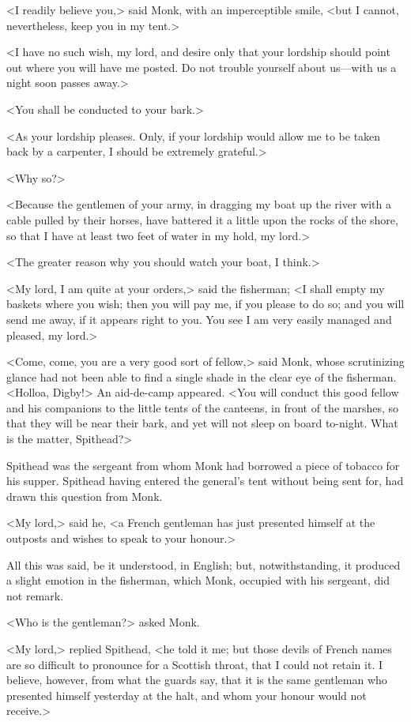 <I readily believe you,> said Monk, with an imperceptible smile, <but I cannot, nevertheless, keep you in my tent.>

<I have no such wish, my lord, and desire only that your lordship should point out where you will have me posted. Do not trouble yourself about us—with us a night soon passes away.>

<You shall be conducted to your bark.>

<As your lordship pleases. Only, if your lordship would allow me to be taken back by a carpenter, I should be extremely grateful.>

<Why so?>

<Because the gentlemen of your army, in dragging my boat up the river with a cable pulled by their horses, have battered it a little upon the rocks of the shore, so that I have at least two feet of water in my hold, my lord.>

<The greater reason why you should watch your boat, I think.>

<My lord, I am quite at your orders,> said the fisherman; <I shall empty my baskets where you wish; then you will pay me, if you please to do so; and you will send me away, if it appears right to you. You see I am very easily managed and pleased, my lord.>

<Come, come, you are a very good sort of fellow,> said Monk, whose scrutinizing glance had not been able to find a single shade in the clear eye of the fisherman. <Holloa, Digby!> An aid-de-camp appeared. <You will conduct this good fellow and his companions to the little tents of the canteens, in front of the marshes, so that they will be near their bark, and yet will not sleep on board to-night. What is the matter, Spithead?>

Spithead was the sergeant from whom Monk had borrowed a piece of tobacco for his supper. Spithead having entered the general's tent without being sent for, had drawn this question from Monk.

<My lord,> said he, <a French gentleman has just presented himself at the outposts and wishes to speak to your honour.>

All this was said, be it understood, in English; but, notwithstanding, it produced a slight emotion in the fisherman, which Monk, occupied with his sergeant, did not remark.

<Who is the gentleman?> asked Monk.

<My lord,> replied Spithead, <he told it me; but those devils of French names are so difficult to pronounce for a Scottish throat, that I could not retain it. I believe, however, from what the guards say, that it is the same gentleman who presented himself yesterday at the halt, and whom your honour would not receive.>

